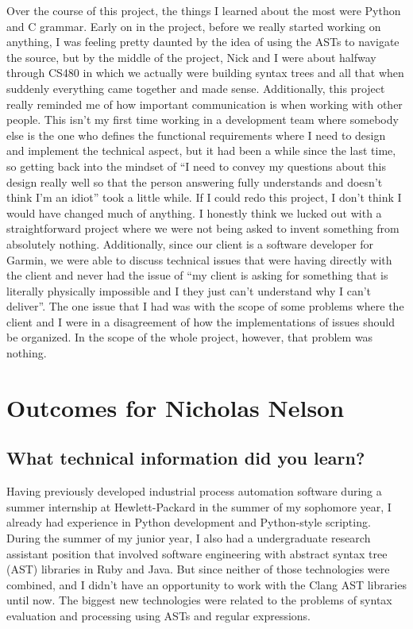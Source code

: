 \documentclass[11pt]{scrreprt}
\begin{document}
Over the course of this project, the things I learned about the most were Python and C grammar. Early on in the project, before we really started working on anything, I was feeling pretty daunted by the idea of using the ASTs to navigate the source, but by the middle of the project, Nick and I were about halfway through CS480 in which we actually were building syntax trees and all that when suddenly everything came together and made sense. Additionally, this project really reminded me of how important communication is when working with other people. This isn’t my first time working in a development team where somebody else is the one who defines the functional requirements where I need to design and implement the technical aspect, but it had been a while since the last time, so getting back into the mindset of “I need to convey my questions about this design really well so that the person answering fully understands and doesn’t think I’m an idiot” took a little while. If I could redo this project, I don’t think I would have changed much of anything. I honestly think we lucked out with a straightforward project where we were not being asked to invent something from absolutely nothing. Additionally, since our client is a software developer for Garmin, we were able to discuss technical issues that were having directly with the client and never had the issue of “my client is asking for something that is literally physically impossible and I they just can’t understand why I can’t deliver”. The one issue that I had was with the scope of some problems where the client and I were in a disagreement of how the implementations of issues should be organized. In the scope of the whole project, however, that problem was nothing.


\section{Outcomes for Nicholas Nelson}

\subsection{What technical information did you learn?}

Having previously developed industrial process automation software during a summer internship at Hewlett-Packard in the summer of my sophomore year, I already had experience in Python development and Python-style scripting. During the summer of my junior year, I also had a undergraduate research assistant position that involved software engineering with abstract syntax tree (AST) libraries in Ruby and Java. But since neither of those technologies were combined, and I didn't have an opportunity to work with the Clang AST libraries until now.
The biggest new technologies were related to the problems of syntax evaluation and processing using ASTs and regular expressions.
\end{document}
